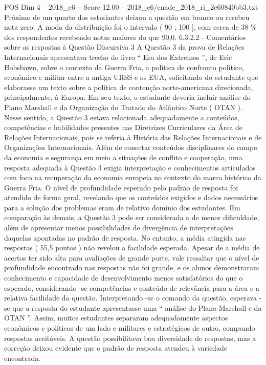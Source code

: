 \begin{textsample}{POS Dim 4 – 2018\_c6 – Score 12.00 – 2018\_c6/enade\_2018\_ri\_2e60840bb3.txt}
Próximo de um quarto dos estudantes deixou a questão em branco ou recebeu nota zero.
A moda da distribuição foi o intervalo ( 90 ; 100 ], com cerca de 38 \% dos respondentes recebendo notas maiores do que 90,0. 6.3.2.2 - Comentários sobre as respostas à Questão Discursiva 3 A Questão 3 da prova de Relações Internacionais apresentava trecho do livro “ Era dos Extremos ”, de Eric Hobsbawn, sobre o contexto da Guerra Fria, a política de confronto político, econômico e militar entre a antiga URSS e os EUA, solicitando do estudante que elaborasse um texto sobre a política de contenção norte-americana direcionada, principalmente, à Europa.
Em seu texto, o estudante deveria incluir análise do Plano Marshall e da Organização do Tratado do Atlântico Norte ( OTAN ).
Nesse sentido, a Questão 3 estava relacionada adequadamente a conteúdos, competências e habilidades presentes nas Diretrizes Curriculares da Área de Relações Internacionais, pois se referia à História das Relações Internacionais e de Organizações Internacionais.
Além de conectar conteúdos disciplinares do campo da economia e segurança em meio a situações de conflito e cooperação, uma resposta adequada à Questão 3 exigia interpretação e conhecimentos articulados com foco na recuperação da economia europeia no contexto do marco histórico da Guerra Fria.
O nível de profundidade esperado pelo padrão de resposta foi atendido de forma geral, revelando que os conteúdos exigidos e dados necessários para a solução dos problemas eram de relativo domínio dos estudantes.
Em comparação às demais, a Questão 3 pode ser considerada a de menor dificuldade, além de apresentar menos possibilidades de divergência de interpretações daquelas apontadas no padrão de resposta.
No entanto, a média atingida nas respostas ( 55,5 pontos ) não revelou a facilidade esperada.
Apesar de a média de acertos ter sido alta para avaliações de grande porte, vale ressaltar que o nível de profundidade encontrado nas respostas não foi grande, e os alunos demonstraram conhecimento e capacidade de desenvolvimento menos satisfatórios do que o esperado, considerando -se competências e conteúdo de relevância para a área e a relativa facilidade da questão.
Interpretando -se o comando da questão, esperava -se que a resposta do estudante apresentasse uma “ análise do Plano Marshall e da OTAN ”.
Assim, muitos estudantes separaram adequadamente aspectos econômicos e políticos de um lado e militares e estratégicos de outro, compondo respostas aceitáveis.
A questão possibilitava boa diversidade de respostas, mas a correção deixou evidente que o padrão de resposta atendeu à variedade encontrada.

\end{textsample}
